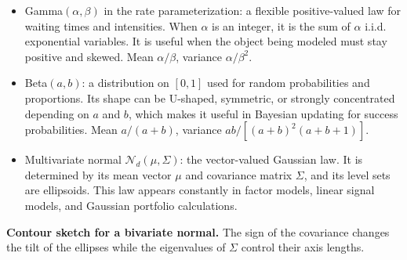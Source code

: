 \documentclass[11pt]{article}
\theoremstyle{definition}
\begin{document}
\begin{itemize}
\begin{itemize}
\[        \]
        \item Gamma$(\alpha,\beta)$ in the rate parameterization: a flexible positive-valued law for waiting times and intensities. When $\alpha$ is an integer, it is the sum of $\alpha$ i.i.d. exponential variables. It is useful when the object being modeled must stay positive and skewed. Mean $\alpha/\beta$, variance $\alpha/\beta^2$.
        \item Beta$(a,b)$: a distribution on $[0,1]$ used for random probabilities and proportions. Its shape can be U-shaped, symmetric, or strongly concentrated depending on $a$ and $b$, which makes it useful in Bayesian updating for success probabilities. Mean $a/(a+b)$, variance $ab/[(a+b)^2(a+b+1)]$.
        \item Multivariate normal $\mathcal{N}_d(\mu,\Sigma)$: the vector-valued Gaussian law. It is determined by its mean vector $\mu$ and covariance matrix $\Sigma$, and its level sets are ellipsoids. This law appears constantly in factor models, linear signal models, and Gaussian portfolio calculations.
    \end{itemize}
\end{itemize}

\textbf{Contour sketch for a bivariate normal.} The sign of the covariance changes the tilt of the ellipses while the eigenvalues of $\Sigma$ control their axis lengths.

\begin{center}
\end{center}
\end{document}
